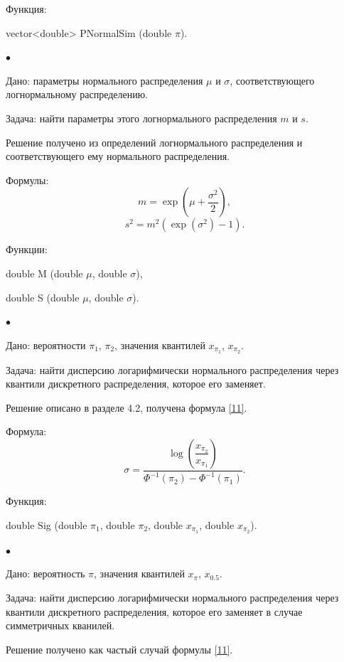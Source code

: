 \documentclass[12pt]{article}
\begin{document}
	Функция:
	
	vector<double> PNormalSim (double $\pi$).
	
	$\bullet$
	
	Дано:
	параметры нормального распределения $\mu$ и $\sigma$, соответствующего логнормальному распределению.
	
	Задача:
	найти параметры этого логнормального распределения $m$ и $s$. 
	
	Решение получено из определений логнормального распределения и соответствующего ему нормального распределения.
	
	Формулы:
	\begin{equation*}
		m = \exp(\mu+\frac{\sigma ^{2}}{2}),
	\end{equation*}
	\begin{equation*}
		s^{2} = m^{2}(\exp(\sigma^{2})-1).
	\end{equation*}
	
	Функции:
	
	double M (double $\mu$, double $\sigma$),
	
	double S (double $\mu$, double $\sigma$).
	
	$\bullet$
	
	Дано:
	вероятности $\pi_{1}$, $\pi_{2}$, значения квантилей $x_{\pi_{1}}$, $x_{\pi_{2}}$.
	
	Задача:
	найти дисперсию логарифмически нормального распределения через квантили дискретного распределения, которое его заменяет.
	
	Решение описано в разделе 4.2, получена формула \eqref{11}.
	
	Формула:
	\begin{equation*}
		\displaystyle{\sigma = \dfrac{\log\left(\dfrac{x_{\pi_{2}}}{x_{\pi_{1}}}\right)}{\Phi ^{-1}(\pi_{2}) - \Phi ^{-1}(\pi_{1})}}.
	\end{equation*}
	
	Функция:
	
	double Sig (double $\pi_{1}$, double $\pi_{2}$, double $x_{\pi_{1}}$, double $x_{\pi_{2}}$).
	
	$\bullet$
	
	Дано:
	вероятность $\pi$, значения квантилей $x_{\pi}$, $x_{0.5}$.
	
	Задача:
	найти дисперсию логарифмически нормального распределения через квантили дискретного распределения, которое его заменяет в случае симметричных кванилей.
	
	Решение получено как частый случай формулы \eqref{11}.
	
\end{document}
